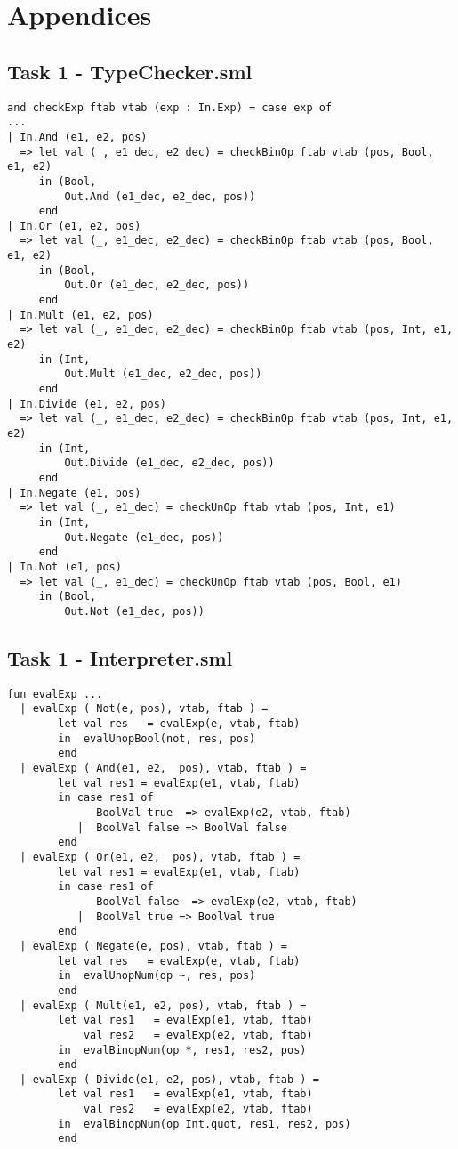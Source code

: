 \documentclass{article}
\begin{document}
\newpage

\section{Appendices}

\subsection{Task 1 - TypeChecker.sml}\label{app:1type}

\begin{lstlisting}
and checkExp ftab vtab (exp : In.Exp) = case exp of
...
| In.And (e1, e2, pos)
  => let val (_, e1_dec, e2_dec) = checkBinOp ftab vtab (pos, Bool, e1, e2)
     in (Bool,
         Out.And (e1_dec, e2_dec, pos))
     end
| In.Or (e1, e2, pos)
  => let val (_, e1_dec, e2_dec) = checkBinOp ftab vtab (pos, Bool, e1, e2)
     in (Bool,
         Out.Or (e1_dec, e2_dec, pos))
     end
| In.Mult (e1, e2, pos)
  => let val (_, e1_dec, e2_dec) = checkBinOp ftab vtab (pos, Int, e1, e2)
     in (Int,
         Out.Mult (e1_dec, e2_dec, pos))
     end
| In.Divide (e1, e2, pos)
  => let val (_, e1_dec, e2_dec) = checkBinOp ftab vtab (pos, Int, e1, e2)
     in (Int,
         Out.Divide (e1_dec, e2_dec, pos))
     end
| In.Negate (e1, pos)
  => let val (_, e1_dec) = checkUnOp ftab vtab (pos, Int, e1)
     in (Int,
         Out.Negate (e1_dec, pos))
     end
| In.Not (e1, pos)
  => let val (_, e1_dec) = checkUnOp ftab vtab (pos, Bool, e1)
     in (Bool,
         Out.Not (e1_dec, pos))
\end{lstlisting}

\subsection{Task 1 - Interpreter.sml}\label{app:1inter}
\begin{lstlisting}
fun evalExp ...
  | evalExp ( Not(e, pos), vtab, ftab ) =
        let val res   = evalExp(e, vtab, ftab)
        in  evalUnopBool(not, res, pos)
        end
  | evalExp ( And(e1, e2,  pos), vtab, ftab ) =
        let val res1 = evalExp(e1, vtab, ftab)
        in case res1 of
              BoolVal true  => evalExp(e2, vtab, ftab)
           |  BoolVal false => BoolVal false
        end
  | evalExp ( Or(e1, e2,  pos), vtab, ftab ) =
        let val res1 = evalExp(e1, vtab, ftab)
        in case res1 of
              BoolVal false  => evalExp(e2, vtab, ftab)
           |  BoolVal true => BoolVal true
        end
  | evalExp ( Negate(e, pos), vtab, ftab ) =
        let val res   = evalExp(e, vtab, ftab)
        in  evalUnopNum(op ~, res, pos)
        end
  | evalExp ( Mult(e1, e2, pos), vtab, ftab ) =
        let val res1   = evalExp(e1, vtab, ftab)
            val res2   = evalExp(e2, vtab, ftab)
        in  evalBinopNum(op *, res1, res2, pos)
        end
  | evalExp ( Divide(e1, e2, pos), vtab, ftab ) =
        let val res1   = evalExp(e1, vtab, ftab)
            val res2   = evalExp(e2, vtab, ftab)
        in  evalBinopNum(op Int.quot, res1, res2, pos)
        end
\end{lstlisting}
\end{document}
